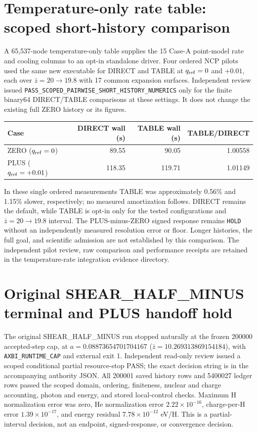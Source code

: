 \documentclass[11pt]{article}
\begin{document}
\section{Temperature-only rate table: scoped short-history comparison}
A 65,537-node temperature-only table supplies the 15 Case-A point-model rate and cooling columns to an opt-in standalone driver. Four ordered NCP pilots used the same new executable for DIRECT and TABLE at $q_{\rm ref}=0$ and $+0.01$, each over $\bar z=20\to19.8$ with 17 common expansion surfaces. Independent review issued \texttt{PASS\_SCOPED\_PAIRWISE\_SHORT\_HISTORY\_NUMERICS} only for the finite binary64 DIRECT/TABLE comparisons at these settings. It does not change the existing full ZERO history or its figures.

\begin{center}
\begin{tabular}{lrrr}\toprule
Case & DIRECT wall (s) & TABLE wall (s) & TABLE/DIRECT\\\midrule
ZERO ($q_{\rm ref}=0$) & 89.55 & 90.05 & 1.00558\\
PLUS ($q_{\rm ref}=+0.01$) & 118.35 & 119.71 & 1.01149\\\bottomrule
\end{tabular}
\end{center}
In these single ordered measurements TABLE was approximately 0.56\% and 1.15\% slower, respectively; no measured amortization follows. DIRECT remains the default, while TABLE is opt-in only for the tested configurations and $\bar z=20\to19.8$ interval. The PLUS-minus-ZERO signed response remains \texttt{HOLD} without an independently measured resolution error or floor. Longer histories, the full goal, and scientific admission are not established by this comparison. The independent pilot review, raw comparison and performance receipts are retained in the temperature-rate integration evidence directory.

\section{Original SHEAR\_HALF\_MINUS terminal and PLUS handoff hold}
The original SHEAR\_HALF\_MINUS run stopped naturally at the frozen 200000 accepted-step cap, at $a=0.08873654701704167$ ($\bar z=10.269313869154184$), with \texttt{AXBI\_RUNTIME\_CAP} and external exit 1. Independent read-only review issued a scoped conditional partial resource-stop PASS; the exact decision string is in the accompanying authority JSON. All 200001 saved history rows and 5400027 ledger rows passed the scoped domain, ordering, finiteness, nuclear and charge accounting, photon and energy, and stored local-control checks. Maximum H normalization error was zero, He normalization error $2.22\times10^{-16}$, charge-per-H error $1.39\times10^{-17}$, and energy residual $7.78\times10^{-12}$ eV/H. This is a partial-interval decision, not an endpoint, signed-response, or convergence decision.
\end{document}
